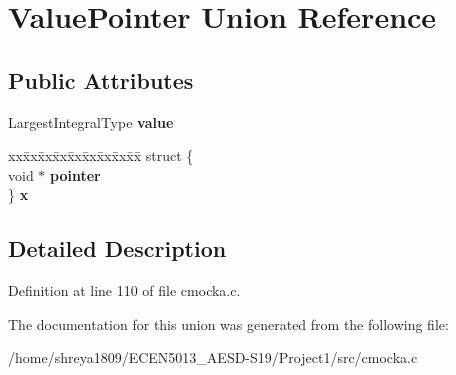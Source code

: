 \hypertarget{unionValuePointer}{}\section{Value\+Pointer Union Reference}
\label{unionValuePointer}
\subsection*{Public Attributes}
\begin{DoxyCompactItemize}
\item 
\mbox{\label{unionValuePointer_ad8994d8ea772e4033e1017ecb7b7b251}} 
Largest\+Integral\+Type {\bfseries value}
\item 
\mbox{\label{unionValuePointer_a088c1a29a21d4bb2d6529c63fb08dff3}} 
\begin{tabbing}
xx\=xx\=xx\=xx\=xx\=xx\=xx\=xx\=xx\=\kill
struct \{\\
\>void $\ast$ {\bfseries pointer}\\
\} {\bfseries x}\\

\end{tabbing}\end{DoxyCompactItemize}


\subsection{Detailed Description}


Definition at line 110 of file cmocka.\+c.



The documentation for this union was generated from the following file\+:\begin{DoxyCompactItemize}
\item 
/home/shreya1809/\+E\+C\+E\+N5013\+\_\+\+A\+E\+S\+D-\/\+S19/\+Project1/src/cmocka.\+c\end{DoxyCompactItemize}
